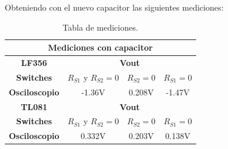Obteniendo con el nuevo capacitor las siguientes mediciones:

\begin{table}[H]
\begin{center}
\begin{tabular}{|c|c|c|c|}
\hline
\multicolumn{4}{|c|}{\textbf{Mediciones con capacitor}}                                        \\ \hline
\textbf{LF356}        & \multicolumn{3}{c|}{\textbf{Vout}}                       \\ \hline
\textbf{Switches}     & $R_{S1}$ y $ R_{S2} = 0$ & $ R_{S2} = 0$ & $ R_{S1} = 0$ \\ \hline
\textbf{Osciloscopio} & -1.36V                    & 0.208V      & -1.47V      \\ \hline
\textbf{TL081}        & \multicolumn{3}{c|}{\textbf{Vout}}                       \\ \hline
\textbf{Switches}     & $R_{S1}$ y $ R_{S2} = 0$ & $ R_{S2} = 0$ & $ R_{S1} = 0$ \\ \hline
\textbf{Osciloscopio} & 0.332V                   & 0.203V        & 0.138V        \\ \hline
\end{tabular}
\end{center}
\caption{Tabla de mediciones.}
\label{tab:vout}
\end{table}

